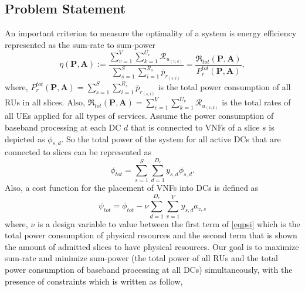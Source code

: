 \documentclass[conference]{IEEEtran}
\begin{document}
\subsection{Problem Statement}
An important criterion to measure the optimality of a system is energy efficiency represented as the sum-rate to sum-power
\begin{equation}
\textstyle \eta(\boldsymbol{P},\boldsymbol{A}) := \frac{\sum\limits_{v=1}^{V} \sum\limits_{k=1}^{{U}_v}\mathcal{R}_{u_{(v,k)}} }{\sum\limits_{s=1}^{S} \sum\limits_{i=1}^{{R}_s}\bar{p}_{r_{(s,i)}}} = \frac{\mathfrak{R}_{tot}(\boldsymbol{P},\boldsymbol{A})}{P_r^{{tot}}(\boldsymbol{P},\boldsymbol{A})},
\end{equation}
where, $P_r^{tot}(\boldsymbol{P},\boldsymbol{A}) = \sum\limits_{s=1}^{S}\sum\limits_{i=1}^{{R}_s}\bar{p}_{r_{(s,i)}}$ is the total power consumption of all RUs in all slices. Also, $\mathfrak{R}_{tot}(\boldsymbol{P},\boldsymbol{A}) = \sum\limits_{v=1}^{V} \sum\limits_{k=1}^{{U}_v}\mathcal{R}_{u_{(v,k)}} $ is the total rates of all UEs applied for all types of services.
Assume the power consumption of baseband processing at each DC $d$ that is connected to VNFs of a slice $s$ is depicted as
$\phi_{s,d}$. So the total power of the system for all active DCs that are connected to slices can be represented as
\begin{equation*}
\textstyle \phi_{tot} = \sum_{s=1}^{S}\sum_{d=1}^{D_c}y_{s,d}\phi_{s,d}.
\end{equation*}
Also, a cost function for the placement of VNFs into DCs is defined as
\begin{equation}\label{eqpsi}
\textstyle  \psi_{tot} = \phi_{tot} - \nu \sum_{d=1}^{D_c}\sum_{v=1}^{V}y_{s,d}a_{v,s}
\end{equation}
where, $\nu$ is a design variable to value between the first term of \eqref{eqpsi} which is the total power consumption of physical resources and the second term that is shown the amount of admitted slices to have physical resources.
Our goal is to maximize sum-rate and minimize sum-power (the total power of all RUs and the total power consumption of baseband processing at all DCs) simultaneously, with the presence of constraints which is written as follow,
\end{document}
